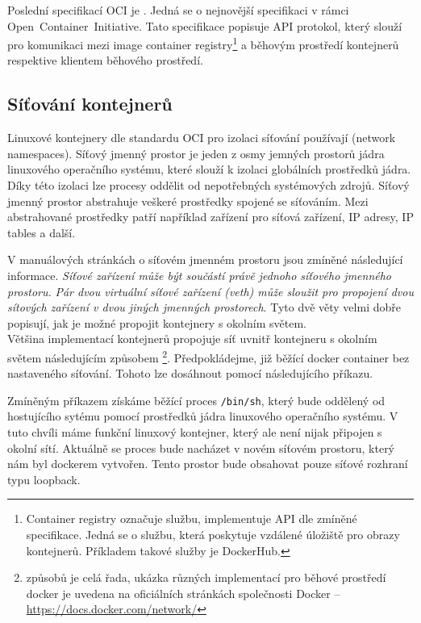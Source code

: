 Poslední specifikací OCI je . Jedná se o nejnovější specifikaci v rámci Open~Container~Initiative. Tato specifikace popisuje API protokol, který slouží pro komunikaci mezi image container registry\footnote{Container registry označuje službu, implementuje API dle zmíněné specifikace. Jedná se o službu, která poskytuje vzdálené úložiště pro obrazy kontejnerů. Příkladem takové služby je DockerHub.} a běhovým prostředí kontejnerů respektive klientem běhového prostředí.\cite{opencontainerinitiative_2022_open}


\subsection{Síťování kontejnerů}
Linuxové kontejnery dle standardu OCI pro izolaci síťování používají (network namespaces).
Síťový jmenný prostor je jeden z osmy jemných prostorů jádra linuxového operačního systému, které slouží k izolaci globálních prostředků jádra. Díky této izolaci lze procesy oddělit od nepotřebných systémových zdrojů. Síťový jmenný prostor abstrahuje veškeré prostředky spojené se síťováním. Mezi abstrahované prostředky patří například zařízení pro síťová zařízení, IP adresy, IP tables a další.\cite{thelinuxmanpagesproject_2022_namespaces7}\cite{thelinuxmanpagesproject_2022_network_namespaces7}

V manuálových stránkách o síťovém jmenném prostoru jsou zmíněné následující informace. \emph{Síťové zařízení může být součástí právě jednoho síťového jmenného prostoru.} \emph{Pár dvou virtuální síťové zařízení (veth) může sloužit pro propojení dvou sítových zařízení v dvou jiných jmenných prostorech}.\cite{thelinuxmanpagesproject_2022_network_namespaces7} Tyto dvě věty velmi dobře popisují, jak je možné propojit kontejnery s okolním světem.\\
Většina implementací kontejnerů propojuje síť uvnitř kontejneru s okolním světem následujícím způsobem \footnote{způsobů je celá řada, ukázka různých implementací pro běhové prostředí docker je uvedena na oficiálních stránkách společnosti Docker -- \url{https://docs.docker.com/network/}}. Předpokládejme, již běžící docker container bez nastaveného síťování. Tohoto lze dosáhnout pomocí následujícího příkazu.

Zmíněným příkazem získáme běžící proces \verb|/bin/sh|, který bude oddělený od hostujícího sytému pomocí prostředků jádra linuxového operačního systému. V tuto chvíli máme funkční linuxový kontejner, který ale není nijak připojen s okolní sítí. Aktuálně se proces bude nacházet v novém síťovém prostoru, který nám byl dockerem vytvořen. Tento prostor bude obsahovat pouze síťové rozhraní typu loopback. 

